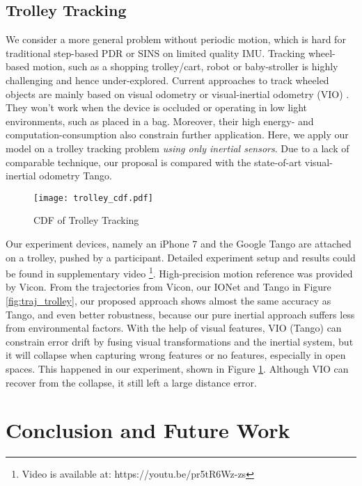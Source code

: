 \documentclass[letterpaper]{article}
\begin{document}
\subsection{Trolley Tracking}
	
    We consider a more general problem without periodic motion, which is hard for traditional step-based PDR or SINS on limited quality IMU. Tracking wheel-based motion, such as a shopping trolley/cart, robot or baby-stroller is highly challenging and hence under-explored. Current approaches to track wheeled objects are mainly based on visual odometry or visual-inertial odometry (VIO) \cite{Li2013b,Bloesch2015}. They won't work when the device is occluded or operating in low light environments, such as placed in a bag. Moreover, their high energy- and computation-consumption also constrain further application. Here, we apply our model on a trolley tracking problem \textit{using only inertial sensors}. Due to a lack of comparable technique, our proposal is compared with the state-of-art visual-inertial odometry Tango.
    
    \begin{figure}
    	\centering
        \texttt{[image: trolley\_cdf.pdf]}
        \caption{\label{fig:trolley_cdf}CDF of Trolley Tracking}
    \end{figure}  
    
    Our experiment devices, namely an iPhone 7 and the Google Tango are attached on a trolley, pushed by a participant. Detailed experiment setup and results could be found in supplementary video \footnote{Video is available at: https://youtu.be/pr5tR6Wz-zs}. High-precision motion reference was provided by Vicon. From the trajectories from Vicon, our IONet and Tango in Figure \ref{fig:traj_trolley}, our proposed approach shows almost the same accuracy as Tango, and even better robustness, because our pure inertial approach suffers less from environmental factors. With the help of visual features, VIO (Tango) can constrain error drift by fusing visual transformations and the inertial system, but it will collapse when capturing wrong features or no features, especially in open spaces. This happened in our experiment, shown in Figure \ref{fig:trolley_cdf}. Although VIO can recover from the collapse, it still left a large distance error.

\section{Conclusion and Future Work}
\end{document}
